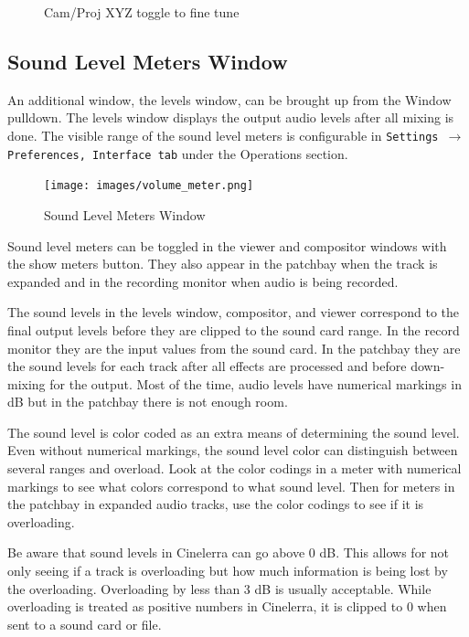 \begin{figure}[htpb]
\begin{minipage}{.29\linewidth}
        \caption{Cam/Proj XYZ toggle to fine tune}
        \label{fig:overlays_list3}
    \end{minipage}
\end{figure}


\subsection{Sound Level Meters Window}%
\label{sub:sound_level_meters_window}

An additional window, the levels window, can be brought up from the Window pulldown.  
The levels window displays the output audio levels after all mixing is done.  
The visible range of the sound level meters is configurable in \texttt{Settings $\rightarrow$ Preferences, Interface tab} under the Operations section.

\begin{figure} 
    \centering
    \texttt{[image: images/volume\_meter.png]}
    \caption{Sound Level Meters Window}
    \label{fig:volume_meter}
\end{figure}

Sound level meters can be toggled in the viewer and compositor windows with the show meters button.  
They also appear in the patchbay when the track is expanded and in the recording monitor when audio is being recorded. 

The sound levels in the levels window, compositor, and viewer correspond to the final output levels before they are clipped to the sound card range.  
In the record monitor they are the input values from the sound card.  
In the patchbay they are the sound levels for each track after all effects are processed and before down-mixing for the output.  
Most of the time, audio levels have numerical markings in dB but in the patchbay there is not enough room.



The sound level is color coded as an extra means of determining the sound level.  
Even without numerical markings, the sound level color can distinguish between several ranges and overload.  
Look at the color codings in a meter with numerical markings to see what colors correspond to what sound level.  
Then for meters in the patchbay in expanded audio tracks, use the color codings to see if it is overloading.

Be aware that sound levels in Cinelerra can go above 0 dB.  
This allows for not only seeing if a track is overloading but how much information is being lost by the overloading.  
Overloading by less than 3 dB is usually acceptable.  
While overloading is treated as positive numbers in Cinelerra, it is clipped to 0 when sent to a sound card or file.







